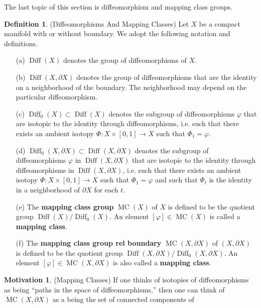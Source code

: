 \documentclass[12pt]{article}
\theoremstyle{definition}
\newtheorem{definition}[theorem]{Definition}
\newtheorem{motivation}[theorem]{Motivation}
\numberwithin{equation}{section}
\newcommand{\op}{\operatorname}
\begin{document}
The last topic of this section is diffeomorphism and mapping class groups.

\begin{definition} (Diffeomorphisms And Mapping Classes) Let $X$ be a compact manifold with or without boundary. We adopt the following notation and definitions.
\begin{itemize}
\item[(a)] $\op{Diff}(X)$ denotes the group of diffeomorphisms of $X$.
\item[(b)] $\op{Diff}(X,\partial X)$ denotes the group of diffeomorphisms that are the identity on a neighborhood of the boundary. The neighborhood may depend on the particular diffeomorphism.
\item[(c)] $\op{Diff}_0(X) \subset \op{Diff}(X)$ denotes the subgroup of diffeomorphisms $\varphi$ that are isotopic to the identity through diffeomorphisms, i.e. such that there exists an ambient isotopy $\Phi:X \times [0,1] \to X$ such that $\Phi_1 = \varphi$.
\item[(d)] $\op{Diff}_0(X,\partial X) \subset \op{Diff}(X,\partial X)$ denotes the subgroup of diffeomorphisms $\varphi$ in $\op{Diff}(X,\partial X)$ that are isotopic to the identity through diffeomorphisms in $\op{Diff}(X,\partial X)$, i.e. such that there exists an ambient isotopy $\Phi:X \times [0,1] \to X$ such that $\Phi_1 = \varphi$ and such that $\Phi_t$ is the identity in a neighborhood of $\partial X$ for each $t$.
\item[(e)] The {\bf mapping class group} $\op{MC}(X)$ of $X$ is defined to be the quotient group $\op{Diff}(X)/\op{Diff}_0(X)$. An element $[\varphi] \in \op{MC}(X)$ is called a {\bf mapping class}.
\item[(f)] The {\bf mapping class group rel boundary} $\op{MC}(X,\partial X)$ of $(X,\partial X)$ is defined to be the quotient group $\op{Diff}(X,\partial X)/\op{Diff}_0(X,\partial X)$. An element $[\varphi] \in \op{MC}(X,\partial X)$ is also called a {\bf mapping class}.
\end{itemize}
\end{definition}

\begin{motivation} (Mapping Classes) If one thinks of isotopies of diffeomorphisms as being ``paths in the space of diffeomorphisms,'' then one can think of $\op{MC}(X,\partial X)$ as a being the set of connected components of 
\end{motivation}
\end{document}
